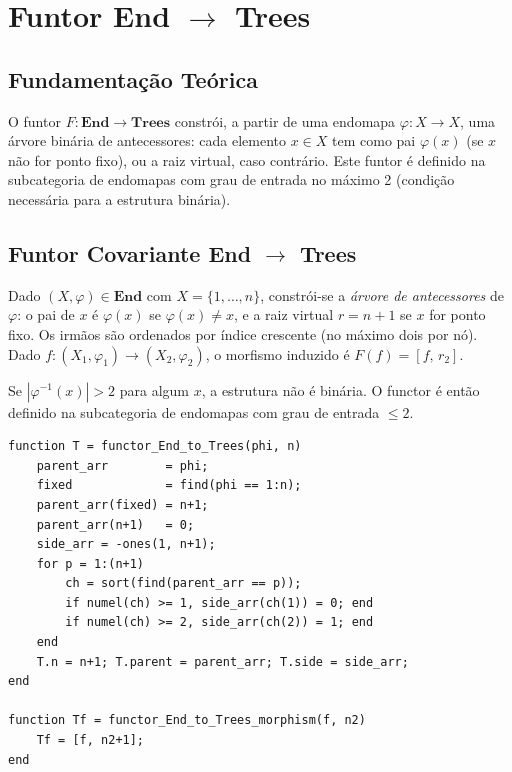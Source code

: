 \section{Funtor End $\rightarrow$ Trees}
\label{sec:functor-end-trees}

\subsection{Fundamentação Teórica}

O funtor $F: \mathbf{End} \to \mathbf{Trees}$ constrói, a partir de uma endomapa $\varphi: X \to X$, uma árvore binária de antecessores: cada elemento $x \in X$ tem como pai $\varphi(x)$ (se $x$ não for ponto fixo), ou a raiz virtual, caso contrário. Este funtor é definido na subcategoria de endomapas com grau de entrada no máximo 2 (condição necessária para a estrutura binária).

\subsection{Funtor Covariante End $\rightarrow$ Trees}

\begin{definition}
Dado $(X, \varphi) \in \mathbf{End}$ com $X = \{1,\ldots,n\}$, constrói-se a \emph{árvore de antecessores} de $\varphi$: o pai de $x$ é $\varphi(x)$ se $\varphi(x) \neq x$, e a raiz virtual $r = n{+}1$ se $x$ for ponto fixo. Os irmãos são ordenados por índice crescente (no máximo dois por nó). Dado $f: (X_1, \varphi_1) \to (X_2, \varphi_2)$, o morfismo induzido é $F(f) = [f,\,r_2]$.
\end{definition}

\begin{remark}
Se $|\varphi^{-1}(x)| > 2$ para algum $x$, a estrutura não é binária. O functor é então definido na subcategoria de endomapas com grau de entrada $\leq 2$.
\end{remark}

\begin{lstlisting}[style=matlab, caption={Funtor covariante $F: \mathbf{End} \to \mathbf{Trees}$}]
function T = functor_End_to_Trees(phi, n)
    parent_arr        = phi;
    fixed             = find(phi == 1:n);
    parent_arr(fixed) = n+1;
    parent_arr(n+1)   = 0;
    side_arr = -ones(1, n+1);
    for p = 1:(n+1)
        ch = sort(find(parent_arr == p));
        if numel(ch) >= 1, side_arr(ch(1)) = 0; end
        if numel(ch) >= 2, side_arr(ch(2)) = 1; end
    end
    T.n = n+1; T.parent = parent_arr; T.side = side_arr;
end

function Tf = functor_End_to_Trees_morphism(f, n2)
    Tf = [f, n2+1];
end
\end{lstlisting}

